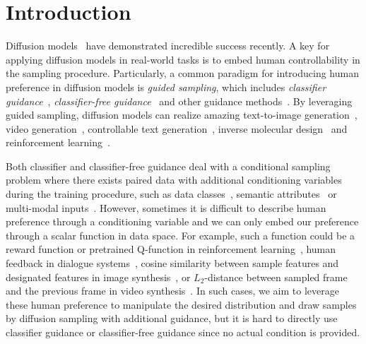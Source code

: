 \section{Introduction}











Diffusion models~\citep{sohl2015deep,ho2020denoising,song2020score} have demonstrated incredible success recently.
A key for applying diffusion models in real-world tasks is to embed human controllability in the sampling procedure. Particularly, a common paradigm for introducing human preference in diffusion models is \textit{guided sampling}, which includes \textit{classifier guidance}~\citep{diffusion_beat_gan}, \textit{classifier-free guidance}~\citep{ho2021classifier} and other guidance methods~\citep{nichol2021glide,ho2022video,zhao2022egsde}. By leveraging guided sampling, diffusion models can realize amazing text-to-image generation~\citep{ramesh2022hierarchical,saharia2022photorealistic,rombach2022high}, video generation~\citep{ho2022video}, controllable text generation~\citep{li2022diffusion}, inverse molecular design~\citep{bao2022equivariant} and 
reinforcement learning~\citep{diffuser, dd}.

Both classifier and classifier-free guidance deal with a conditional sampling problem where there exists paired data with additional conditioning variables during the training procedure, such as data classes~\citep{diffusion_beat_gan}, semantic attributes~\citep{graikos2022diffusion} or multi-modal inputs~\citep{ramesh2022hierarchical,saharia2022photorealistic,rombach2022high}.
However, sometimes it is difficult to describe human preference through a conditioning variable and we can only embed our preference through a scalar function in data space.
For example, such a function could be a reward function or pretrained Q-function in reinforcement learning~\citep{diffuser, sfbc}, human feedback in dialogue systems~\citep{ziegler2019fine}, cosine similarity between sample features and designated features in image synthesis~\citep{zhao2022egsde}, or $L_2$-distance between sampled frame and the previous frame in video synthesis~\citep{ho2022video}. In such cases, we aim to leverage these human preference to manipulate the desired distribution and draw samples by diffusion sampling with additional guidance, but it is hard to directly use classifier guidance or classifier-free guidance since no actual condition is provided.







